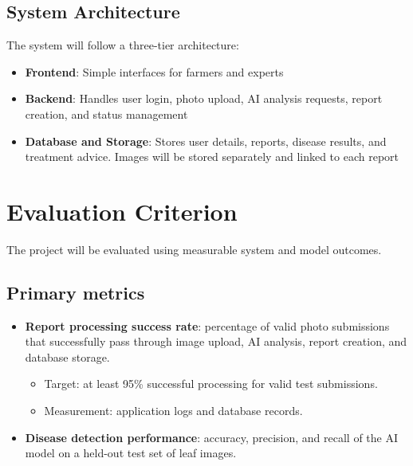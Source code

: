 \documentclass[11pt,a4paper]{article}
\begin{document}
\subsection{System Architecture}
The system will follow a three-tier architecture:
\begin{itemize}[leftmargin=*]
    \item \textbf{Frontend}: Simple interfaces for farmers and experts
    \item \textbf{Backend}: Handles user login, photo upload, AI analysis requests, report creation, and status management
    \item \textbf{Database and Storage}: Stores user details, reports, disease results, and treatment advice. Images will be stored separately and linked to each report
\end{itemize}



\section{Evaluation Criterion}
The project will be evaluated using measurable system and model outcomes.

\subsection{Primary metrics}
\begin{itemize}[leftmargin=*]
    \item \textbf{Report processing success rate}: percentage of valid photo submissions that successfully pass through image upload, AI analysis, report creation, and database storage.
    \begin{itemize}
        \item Target: at least 95\% successful processing for valid test submissions.
        \item Measurement: application logs and database records.
    \end{itemize}
    \item \textbf{Disease detection performance}: accuracy, precision, and recall of the AI model on a held-out test set of leaf images.
\end{itemize}
\end{document}
